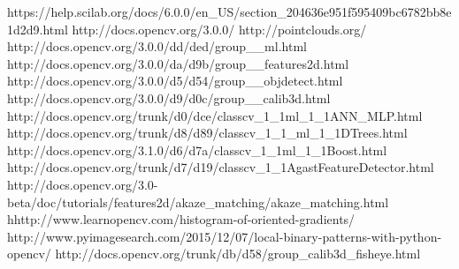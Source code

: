 \documentclass[12pt]{report}
\begin{document}
\begin{thebibliography}{20}
 \hypertarget{scilab}{https://help.scilab.org/docs/6.0.0/en\_US/section\_204636e951f595409bc6782bb8e1d2d9.html}
 \hypertarget{opencv}{http://docs.opencv.org/3.0.0/}
 \hypertarget{pcl}{http://pointclouds.org/}
 \hypertarget{ml}{http://docs.opencv.org/3.0.0/dd/ded/group\_\_ml.html}
 \hypertarget{ff}{http://docs.opencv.org/3.0.0/da/d9b/group\_\_features2d.html}
 \hypertarget{od}{http://docs.opencv.org/3.0.0/d5/d54/group\_\_objdetect.html}
 \hypertarget{cc}{http://docs.opencv.org/3.0.0/d9/d0c/group\_\_calib3d.html}
 \hypertarget{ANN}{http://docs.opencv.org/trunk/d0/dce/classcv\_1\_1ml\_1\_1ANN\_MLP.html}
 \hypertarget{dt}{http://docs.opencv.org/trunk/d8/d89/classcv\_1\_1\_ml\_1\_1DTrees.html}
 \hypertarget{bos}{http://docs.opencv.org/3.1.0/d6/d7a/classcv\_1\_1ml\_1\_1Boost.html}
 \hypertarget{agast}{http://docs.opencv.org/trunk/d7/d19/classcv\_1\_1AgastFeatureDetector.html}
 \hypertarget{akaz}{http://docs.opencv.org/3.0-beta/doc/tutorials/features2d/akaze\_matching/akaze\_matching.html}
 \hypertarget{hog}{hhttp://www.learnopencv.com/histogram-of-oriented-gradients/}
 \hypertarget{lbp}{http://www.pyimagesearch.com/2015/12/07/local-binary-patterns-with-python-opencv/}
 \hypertarget{clb}{http://docs.opencv.org/trunk/db/d58/group\_calib3d\_fisheye.html}
\end{thebibliography}

 
\end{document}
